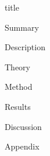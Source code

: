 \documentclass{article}
\begin{document}
{title}

{Summary}
\newpage

\frontmatter

\tableofcontents
\newpage

\mainmatter

{Description}
\newpage

{Theory}
\newpage

{Method}
\newpage

{Results}
\newpage

{Discussion}
\newpage

\nocite{Kalman-library}
\nocite{Median-library}
\printbibliography[heading = bibintoc, title = References] 
\newpage

{Appendix}
\newpage

\end{document}
